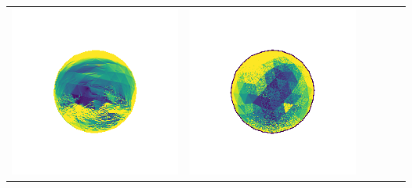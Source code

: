 \begin{tabularx}{\linewidth}{@{}Y@{}Y@{}Y@{}Y@{}Y@{}Y@{}}
\includegraphics[width=\linewidth]{semisynthetic/20160617_1_yu_err.png} &
\includegraphics[width=\linewidth]{semisynthetic/20160617_1_dpsn_err.png} &

\end{tabularx}
